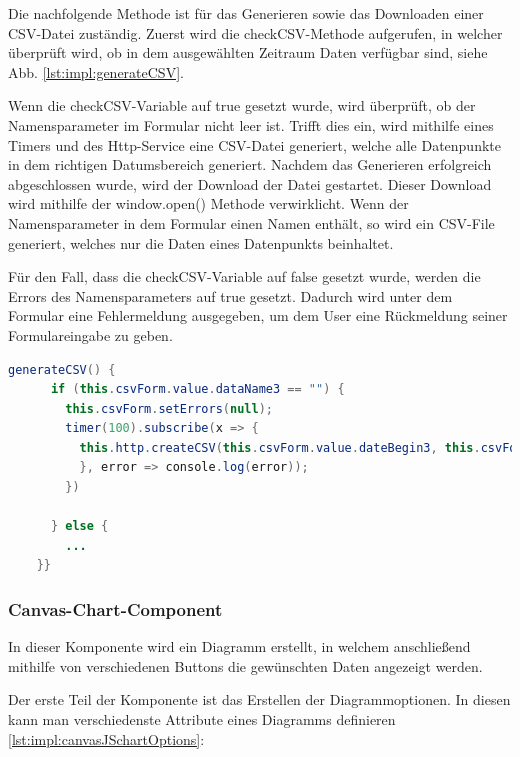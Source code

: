  
Die nachfolgende Methode ist für das Generieren sowie das Downloaden einer CSV-Datei zuständig. Zuerst wird die checkCSV-Methode aufgerufen, in welcher überprüft wird, ob in dem ausgewählten Zeitraum Daten verfügbar sind, siehe Abb. \ref{lst:impl:generateCSV}.

Wenn die checkCSV-Variable auf true gesetzt wurde, wird überprüft, ob der Namensparameter im Formular nicht leer ist. Trifft dies ein, wird mithilfe eines Timers und des Http-Service eine CSV-Datei generiert, welche alle Datenpunkte in dem richtigen Datumsbereich generiert. Nachdem das Generieren erfolgreich abgeschlossen wurde, wird der Download der Datei gestartet. Dieser Download wird mithilfe der window.open() Methode verwirklicht. Wenn der Namensparameter in dem Formular einen Namen enthält, so wird ein CSV-File generiert, welches nur die Daten eines Datenpunkts beinhaltet.
 
Für den Fall, dass die checkCSV-Variable auf false gesetzt wurde, werden die Errors des Namensparameters auf true gesetzt. Dadurch wird unter dem Formular eine Fehlermeldung ausgegeben, um dem User eine Rückmeldung seiner Formulareingabe zu geben.
 
\begin{lstlisting}[language=java,caption=CSV-File generieren,label=lst:impl:generateCSV]
    generateCSV() {
      if (this.csvForm.value.dataName3 == "") {
        this.csvForm.setErrors(null);
        timer(100).subscribe(x => {
          this.http.createCSV(this.csvForm.value.dateBegin3, this.csvForm.value.dateEnd3, this.csvForm.value.timeBegin3, this.csvForm.value.timeEnd3, "C:/angular1/monitor.csv").subscribe(value => { window.open("http://localhost:8081/logEntry/download/");
          }, error => console.log(error));
        })

      } else {
        ...
    }}
\end{lstlisting}


\subsubsection{Canvas-Chart-Component}
 
In dieser Komponente wird ein Diagramm erstellt, in welchem anschließend mithilfe von verschiedenen Buttons die gewünschten Daten angezeigt werden. 
 
Der erste Teil der Komponente ist das Erstellen der Diagrammoptionen. In diesen kann man verschiedenste Attribute eines Diagramms definieren \ref{lst:impl:canvasJSchartOptions}:
 
